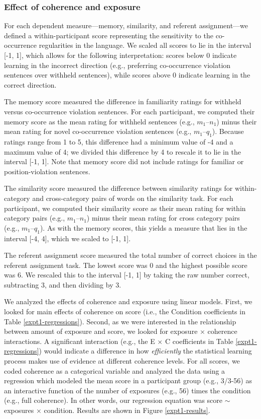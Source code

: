 \documentclass[man,floatsintext]{apa6}
\begin{document}
\subsubsection{Effect of coherence and exposure}

For each dependent measure---memory, similarity, and referent assignment---we defined a within-participant score representing the sensitivity to the co-occurrence regularities in the language. We scaled all scores to lie in the interval [-1, 1], which allows for the following interpretation: scores below 0 indicate learning in the incorrect direction (e.g., preferring co-occurrence violation sentences over withheld sentences), while scores above 0 indicate learning in the correct direction.

The memory score measured the difference in familiarity ratings for withheld versus co-occurrence violation sentences. For each participant, we computed their memory score as the mean rating for withheld sentences (e.g., $m_1$--$n_1$) minus their mean rating for novel co-occurrence violation sentences (e.g., $m_1$--$q_1$). Because ratings range from 1 to 5, this difference had a minimum value of -4 and a maximum value of 4; we divided this difference by 4 to rescale it to lie in the interval [-1, 1]. Note that memory score did not include ratings for familiar or position-violation sentences.

The similarity score measured the difference between similarity ratings for within-category and cross-category pairs of words on the similarity task. For each participant, we computed their similarity score as their mean rating for within category pairs (e.g., $m_1$--$n_1$) minus their mean rating for cross category pairs (e.g., $m_1$--$q_1$). As with the memory scores, this yields a measure that lies in the interval [-4, 4], which we scaled to [-1, 1].

The referent assignment score measured the total number of correct choices in the referent assignment task. The lowest score was 0 and the highest possible score was 6. We rescaled this to the interval [-1, 1] by taking the raw number correct, subtracting 3, and then dividing by 3.

We analyzed the effects of coherence and exposure using linear models. First, we looked for main effects of coherence on score (i.e., the Condition coefficients in Table \ref{expt1-regressions}). Second, as we were interested in the relationship between amount of exposure and score, we looked for exposure $\times$ coherence interactions. A significant interaction (e.g., the E $\times$ C coefficients in Table \ref{expt1-regressions}) would indicate a difference in how \emph{efficiently} the statistical learning process makes use of evidence at different coherence levels. For all scores, we coded coherence as a categorical variable and analyzed the data using a regression which modeled the mean score in a participant group (e.g., 3/3-56) as an interactive function of the number of exposures (e.g., 56) times the condition (e.g., full coherence). In other words, our regression equation was score $\sim$ exposures $\times$ condition. Results are shown in Figure \ref{expt1-results}.
\end{document}
